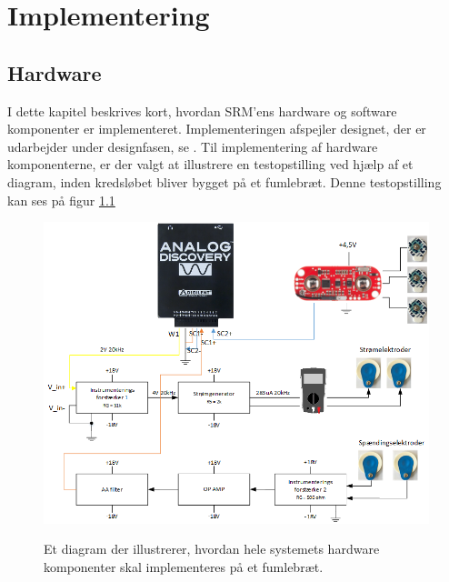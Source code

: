\chapter{Implementering}

\section{Hardware}
I dette kapitel beskrives kort, hvordan SRM'ens hardware og software komponenter er implementeret. Implementeringen afspejler designet, der er udarbejder under designfasen, se .  Til implementering af hardware komponenterne, er der valgt at illustrere en testopstilling ved hjælp af et diagram, inden kredsløbet bliver bygget på et fumlebræt. Denne testopstilling kan ses på figur \ref{fig:integrationstestDiagram}

\begin{figure}[H] 
\centering
{\includegraphics[width=\linewidth]
{Figure/integrationstestDiagram}}
\caption{Et diagram der illustrerer, hvordan hele systemets hardware komponenter skal implementeres på et fumlebræt. }
\label{fig:integrationstestDiagram}
\end{figure}


